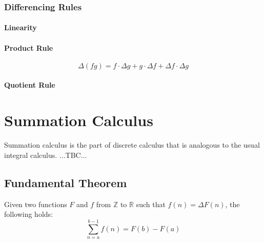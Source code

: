 





\subsubsection{Differencing Rules}  



\paragraph{Linearity}

\paragraph{Product Rule}
\begin{equation}
 \Delta (f g) = f \cdot \Delta g + g \cdot \Delta f + \Delta f \cdot \Delta g
\end{equation}



\paragraph{Quotient Rule}



\section{Summation Calculus}
Summation calculus is the part of discrete calculus that is analogous to the usual integral calculus. ...TBC...

\subsection{Fundamental Theorem}
Given two functions $F$ and $f$ from $\mathbb{Z}$ to $\mathbb{R}$ such that $f(n) = \Delta F(n)$, the following holds:
\begin{equation}
 \sum_{n=a}^{b-1} f(n) = F(b) - F(a)
\end{equation}


